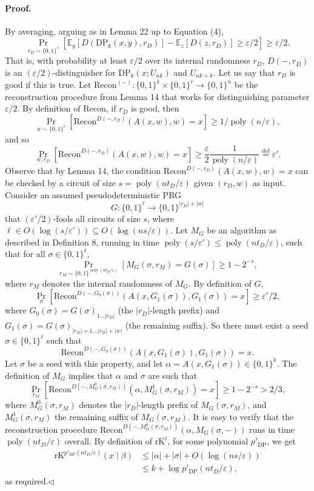 \documentclass[10pt,a4paper]{article}
\begin{document}
\paragraph{Proof.} By averaging, arguing as in Lemma 22 up to Equation (4),
\[\Pr_{r_D\sim\{0,1\}^s}[\mathbb E_y[D(\mathrm{DP}_k(x,y),r_D)]-\mathbb E_z[D(z,r_D)]\geq\varepsilon/2]\geq\varepsilon/2.\tag{5}\]
That is, with probability at least $\varepsilon/2$ over its internal randomness $r_D$, $D(-,r_D)$ is an $(\varepsilon/2)$-distinguisher for $\mathrm{DP}_k(x;U_{nk})$ and $U_{nk+k}$. Let us say that $r_D$ is good if this is true.
Let $\mathrm{Recon}^{(-)}:\{0,1\}^k\times\{0,1\}^r\to\{0,1\}^n$ be the reconstruction procedure from Lemma 14 that works for distinguishing parameter $\varepsilon/2$. By definition of Recon, if $r_D$ is good, then
\[\Pr_{w\sim\{0,1\}^r}[\mathrm{Recon}^{D(-,r_D)}(A(x,w),w)=x]\geq1/\operatorname{poly}(n/\varepsilon),\]
and so
\[\Pr_{w,r_D}[\mathrm{Recon}^{D(-,r_D)}(A(x,w),w)=x]\geq\frac\varepsilon2\frac1{\operatorname{poly}(n/\varepsilon)}\stackrel{\mathrm{def}}=\varepsilon'.\]
Observe that by Lemma 14, the condition $\mathrm{Recon}^{D(-,r_D)}(A(x,w),w)=x$ can be checked by a circuit of size $s=\operatorname{poly}(nt_D/\varepsilon)$ given $(r_D,w)$ as input. Consider an assumed pseudodeterministic PRG
\[G:\{0,1\}^\ell\to\{0,1\}^{|r_D|+|w|}\]
that $(\varepsilon'/2)$-fools all circuits of size $s$, where $\ell\in O(\log(s/\varepsilon'))\subseteq O(\log(ns/\varepsilon))$. Let $M_G$ be an algorithm as described in Definition 8, running in time $\operatorname{poly}(s/\varepsilon')\leq\operatorname{poly}(nt_D/\varepsilon)$, such that for all $\sigma\in\{0,1\}^\ell$,
\[\Pr_{r_M\sim\{0,1\}^{\operatorname{poly}(nt_D/\varepsilon)}}[M_G(\sigma,r_M)=G(\sigma)]\geq1-2^{-s},\]
where $r_M$ denotes the internal randomness of $M_G$. By definition of $G$,
\[\Pr_\sigma[\mathrm{Recon}^{D(-,G_0(\sigma))}(A(x,G_1(\sigma)),G_1(\sigma))=x]\geq\varepsilon'/2,\]
where $G_0(\sigma)=G(\sigma)_{1\ldots|r_D|}$ (the $|r_D|$-length prefix) and $G_1(\sigma)=G(\sigma)_{|r_D|+1\ldots|r_D|+|w|}$ (the remaining suffix). So there must exist a seed $\sigma\in\{0,1\}^\ell$ such that
\[\mathrm{Recon}^{D(-,G_0(\sigma))}(A(x,G_1(\sigma)),G_1(\sigma))=x.\]
Let $\sigma$ be a seed with this property, and let $\alpha=A(x,G_1(\sigma))\in\{0,1\}^k$. The definition of $M_G$ implies that $\alpha$ and $\sigma$ are such that
\[\Pr_{r_M}[\mathrm{Recon}^{D(-,M_G^0(\sigma,r_M))}(\alpha,M_G^1(\sigma,r_M))=x]\geq1-2^{-s}>2/3,\]
where $M_G^0(\sigma,r_M)$ denotes the $|r_D|$-length prefix of $M_G(\sigma,r_M)$, and $M_G^1(\sigma,r_M)$ the remaining suffix of $M_G(\sigma,r_M)$. It is easy to verify that the reconstruction procedure $\mathrm{Recon}^{D(-,M_G^0(\sigma,r_M))}(\alpha,M_G(\sigma,-))$ runs in time $\operatorname{poly}(nt_D/\varepsilon)$ overall. By definition of $\mathrm{rK}^t$, for some polynomial $p'_{\mathrm{DP}}$, we get
\begin{align*}
\mathrm{rK}^{p'_{\mathrm{DP}}(nt_D/\varepsilon)}(x\mid\beta)&\leq|\alpha|+|\sigma|+O(\log(ns/\varepsilon))\\
&\leq k+\log p'_{\mathrm{DP}}(nt_D/\varepsilon),
\end{align*}
as required.\hfill$\triangleleft$
\end{document}

